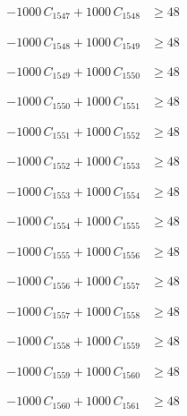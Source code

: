 \documentclass[a4paper,11pt]{article}
\begin{document}
\begin{align}
-1000\,C_{1547} + 1000\,C_{1548} &\geq 48 \nonumber
\end{align}

\begin{align}
-1000\,C_{1548} + 1000\,C_{1549} &\geq 48 \nonumber
\end{align}

\begin{align}
-1000\,C_{1549} + 1000\,C_{1550} &\geq 48 \nonumber
\end{align}

\begin{align}
-1000\,C_{1550} + 1000\,C_{1551} &\geq 48 \nonumber
\end{align}

\begin{align}
-1000\,C_{1551} + 1000\,C_{1552} &\geq 48 \nonumber
\end{align}

\begin{align}
-1000\,C_{1552} + 1000\,C_{1553} &\geq 48 \nonumber
\end{align}

\begin{align}
-1000\,C_{1553} + 1000\,C_{1554} &\geq 48 \nonumber
\end{align}

\begin{align}
-1000\,C_{1554} + 1000\,C_{1555} &\geq 48 \nonumber
\end{align}

\begin{align}
-1000\,C_{1555} + 1000\,C_{1556} &\geq 48 \nonumber
\end{align}

\begin{align}
-1000\,C_{1556} + 1000\,C_{1557} &\geq 48 \nonumber
\end{align}

\begin{align}
-1000\,C_{1557} + 1000\,C_{1558} &\geq 48 \nonumber
\end{align}

\begin{align}
-1000\,C_{1558} + 1000\,C_{1559} &\geq 48 \nonumber
\end{align}

\begin{align}
-1000\,C_{1559} + 1000\,C_{1560} &\geq 48 \nonumber
\end{align}

\begin{align}
-1000\,C_{1560} + 1000\,C_{1561} &\geq 48 \nonumber
\end{align}
\end{document}

